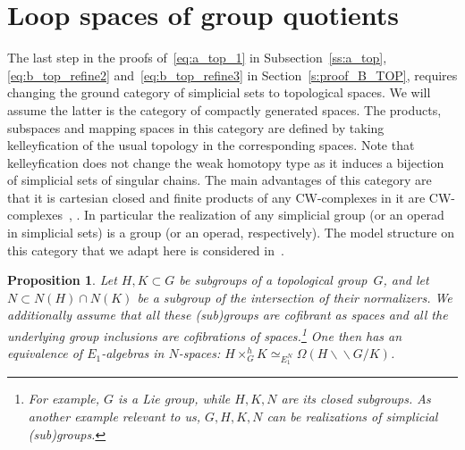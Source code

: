 \documentclass[11pt]{amsart}
\newtheorem{proposition}[theorem]{Proposition}
\theoremstyle{definition}
\newcommand{\bbslash}{\backslash\!\!\backslash}
\numberwithin{equation}{section}
\begin{document}
\appendix

\section{Loop spaces of group quotients}\label{s:appendix}
The last step in the proofs of~\eqref{eq:a_top_1} in Subsection~\ref{ss:a_top}, \eqref{eq:b_top_refine2} and~\eqref{eq:b_top_refine3} in Section~\ref{s:proof_B_TOP}, requires changing the ground category
of simplicial sets to topological spaces. We will assume the latter is the category of compactly generated spaces. The products, subspaces and mapping spaces in this category are defined by taking kelleyfication of the usual topology 
in the corresponding spaces. Note that kelleyfication does not change the weak homotopy type as it induces  a bijection of simplicial sets of singular chains.  The main advantages of this category are that it is cartesian closed and finite products of any CW-complexes in it are CW-complexes~\cite[Appendix]{Lewis}, \cite{Vogt}. In particular the realization of any simplicial group (or an operad in simplicial sets) is a group (or an operad, respectively).
The model structure on this category that we adapt here is considered in~\cite[Section~2.4]{Hovey}.

\begin{proposition}\label{l:E1equiv}
Let $H,K\subset G$ be subgroups of a topological group~$G$, and let $N\subset N(H)\cap N(K)$ be a subgroup of the intersection of their normalizers. We additionally assume that all these (sub)groups are cofibrant as spaces
and all the underlying group inclusions are cofibrations of spaces.\footnote{For example, $G$ is a Lie group, while $H,K,N$ are its closed subgroups. As another example relevant to us, $G,H,K,N$ can be realizations of simplicial (sub)groups.} One then has an equivalence
of $E_1$-algebras in $N$-spaces:
$H\times_G^h K\simeq_{E_1^N}\Omega\left(H\bbslash G/K\right)$.
\end{proposition}
\end{document}
